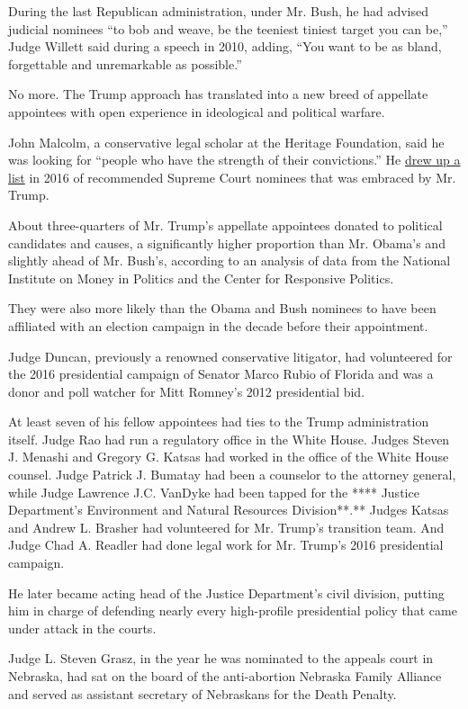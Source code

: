During the last Republican administration, under Mr. Bush, he had
advised judicial nominees ``to bob and weave, be the teeniest tiniest
target you can be,'' Judge Willett said during a speech in 2010, adding,
``You want to be as bland, forgettable and unremarkable as possible.''

No more. The Trump approach has translated into a new breed of appellate
appointees with open experience in ideological and political warfare.

John Malcolm, a conservative legal scholar at the Heritage Foundation,
said he was looking for ``people who have the strength of their
convictions.'' He
\href{https://www.heritage.org/crime-and-justice/impact/heritage-expert-helps-shape-supreme-court-nominee-list}{drew
up a list} in 2016 of recommended Supreme Court nominees that was
embraced by Mr. Trump.

About three-quarters of Mr. Trump's appellate appointees donated to
political candidates and causes, a significantly higher proportion than
Mr. Obama's and slightly ahead of Mr. Bush's, according to an analysis
of data from the National Institute on Money in Politics and the Center
for Responsive Politics.

They were also more likely than the Obama and Bush nominees to have been
affiliated with an election campaign in the decade before their
appointment.

Judge Duncan, previously a renowned conservative litigator, had
volunteered for the 2016 presidential campaign of Senator Marco Rubio of
Florida and was a donor and poll watcher for Mitt Romney's 2012
presidential bid.

At least seven of his fellow appointees had ties to the Trump
administration itself. Judge Rao had run a regulatory office in the
White House. Judges Steven J. Menashi and Gregory G. Katsas had worked
in the office of the White House counsel. Judge Patrick J. Bumatay had
been a counselor to the attorney general, while Judge Lawrence J.C.
VanDyke had been tapped for the **** Justice Department's Environment
and Natural Resources Division**.** Judges Katsas and Andrew L. Brasher
had volunteered for Mr. Trump's transition team. And Judge Chad A.
Readler had done legal work for Mr. Trump's 2016 presidential campaign.

He later became acting head of the Justice Department's civil division,
putting him in charge of defending nearly every high-profile
presidential policy that came under attack in the courts.

Judge L. Steven Grasz, in the year he was nominated to the appeals court
in Nebraska, had sat on the board of the anti-abortion Nebraska Family
Alliance and served as assistant secretary of Nebraskans for the Death
Penalty.

